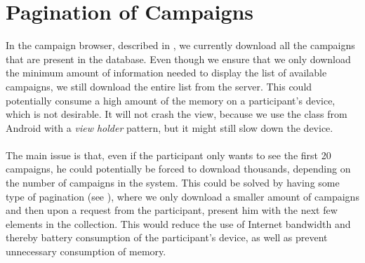 
\section{Pagination of Campaigns}
\label{sec:pagination_of_campaigns}

In the campaign browser, described in , we currently download all the campaigns that are present in the database. Even though we ensure that we only download the minimum amount of information needed to display the list of available campaigns, we still download the entire list from the server. This could potentially consume a high amount of the memory on a participant's device, which is not desirable. It will not crash the view, because we use the  class from Android with a \emph{view holder} pattern, but it might still slow down the device.
\\\\
The main issue is that, even if the participant only wants to see the first 20 campaigns, he could potentially be forced to download thousands, depending on the number of campaigns in the system. This could be solved by having some type of pagination (see ), where we only download a smaller amount of campaigns and then upon a request from the participant, present him with the next few elements in the collection. This would reduce the use of Internet bandwidth and thereby battery consumption of the participant's device, as well as prevent unnecessary consumption of memory.